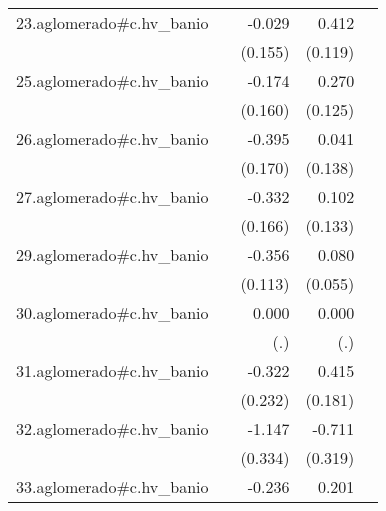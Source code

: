 {\begin{longtable}{l*{4}{D{.}{.}{-1}}}
\addlinespace
23.aglomerado#c.hv\_banio&                     &      -0.029         &       0.412\sym{***}&                     \\
            &                     &     (0.155)         &     (0.119)         &                     \\
\addlinespace
25.aglomerado#c.hv\_banio&                     &      -0.174         &       0.270\sym{*}  &                     \\
            &                     &     (0.160)         &     (0.125)         &                     \\
\addlinespace
26.aglomerado#c.hv\_banio&                     &      -0.395\sym{*}  &       0.041         &                     \\
            &                     &     (0.170)         &     (0.138)         &                     \\
\addlinespace
27.aglomerado#c.hv\_banio&                     &      -0.332\sym{*}  &       0.102         &                     \\
            &                     &     (0.166)         &     (0.133)         &                     \\
\addlinespace
29.aglomerado#c.hv\_banio&                     &      -0.356\sym{**} &       0.080         &                     \\
            &                     &     (0.113)         &     (0.055)         &                     \\
\addlinespace
30.aglomerado#c.hv\_banio&                     &       0.000         &       0.000         &                     \\
            &                     &         (.)         &         (.)         &                     \\
\addlinespace
31.aglomerado#c.hv\_banio&                     &      -0.322         &       0.415\sym{*}  &                     \\
            &                     &     (0.232)         &     (0.181)         &                     \\
\addlinespace
32.aglomerado#c.hv\_banio&                     &      -1.147\sym{***}&      -0.711\sym{*}  &                     \\
            &                     &     (0.334)         &     (0.319)         &                     \\
\addlinespace
33.aglomerado#c.hv\_banio&                     &      -0.236\sym{*}  &       0.201\sym{***}&                     \\

\end{longtable}}
